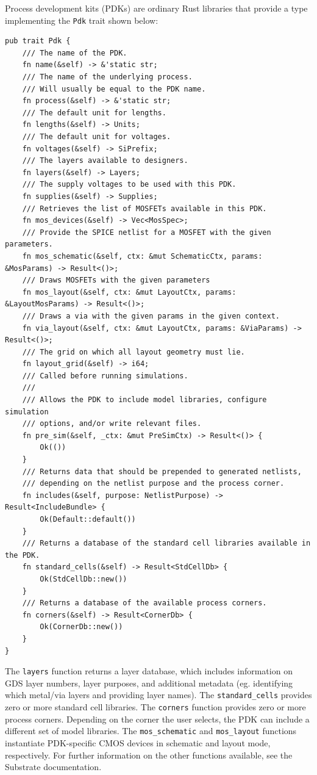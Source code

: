 Process development kits (PDKs) are ordinary Rust libraries that provide a type implementing the \verb|Pdk| trait shown below:

\begin{verbatim}
pub trait Pdk {
    /// The name of the PDK.
    fn name(&self) -> &'static str;
    /// The name of the underlying process.
    /// Will usually be equal to the PDK name.
    fn process(&self) -> &'static str;
    /// The default unit for lengths.
    fn lengths(&self) -> Units;
    /// The default unit for voltages.
    fn voltages(&self) -> SiPrefix;
    /// The layers available to designers.
    fn layers(&self) -> Layers;
    /// The supply voltages to be used with this PDK.
    fn supplies(&self) -> Supplies;
    /// Retrieves the list of MOSFETs available in this PDK.
    fn mos_devices(&self) -> Vec<MosSpec>;
    /// Provide the SPICE netlist for a MOSFET with the given parameters.
    fn mos_schematic(&self, ctx: &mut SchematicCtx, params: &MosParams) -> Result<()>;
    /// Draws MOSFETs with the given parameters
    fn mos_layout(&self, ctx: &mut LayoutCtx, params: &LayoutMosParams) -> Result<()>;
    /// Draws a via with the given params in the given context.
    fn via_layout(&self, ctx: &mut LayoutCtx, params: &ViaParams) -> Result<()>;
    /// The grid on which all layout geometry must lie.
    fn layout_grid(&self) -> i64;
    /// Called before running simulations.
    ///
    /// Allows the PDK to include model libraries, configure simulation
    /// options, and/or write relevant files.
    fn pre_sim(&self, _ctx: &mut PreSimCtx) -> Result<()> {
        Ok(())
    }
    /// Returns data that should be prepended to generated netlists,
    /// depending on the netlist purpose and the process corner.
    fn includes(&self, purpose: NetlistPurpose) -> Result<IncludeBundle> {
        Ok(Default::default())
    }
    /// Returns a database of the standard cell libraries available in the PDK.
    fn standard_cells(&self) -> Result<StdCellDb> {
        Ok(StdCellDb::new())
    }
    /// Returns a database of the available process corners.
    fn corners(&self) -> Result<CornerDb> {
        Ok(CornerDb::new())
    }
}
\end{verbatim}

The \verb|layers| function returns a layer database, which includes information on GDS layer numbers, layer purposes, and additional metadata (eg. identifying which metal/via layers and providing layer names).
The \verb|standard_cells| provides zero or more standard cell libraries.
The \verb|corners| function provides zero or more process corners. Depending on the corner the user selects, the PDK can include a different set of model libraries.
The \verb|mos_schematic| and \verb|mos_layout| functions instantiate PDK-specific CMOS devices in schematic and layout mode, respectively.
For further information on the other functions available, see the Substrate documentation.

